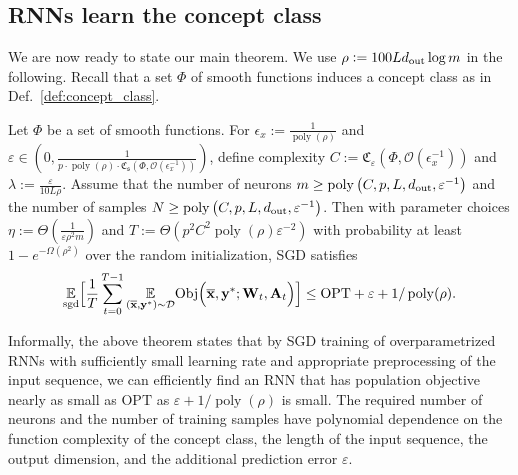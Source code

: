 \subsection{RNNs learn the concept class}
We are now ready to state our main theorem. We use $    \rho :=100 L d_{\mathrm{out}}  \log m$ in the following.  Recall that a set $\Phi$ of smooth functions induces a concept class as in Def.~\ref{def:concept_class}.
\begin{theorem}\label{thm:main_theorem_paper}
	Let $\Phi$ be a set of smooth functions.
	  For  $\epsilon_x := \frac{1}{\operatorname{poly}(\rho)}$ and $\varepsilon \in \left(0, \frac{1}{p \cdot \operatorname{poly}(\rho) \cdot \mathfrak{C}_{\mathfrak{s}}(\Phi, \mathcal{O}(\epsilon_x^{-1}))}\right)$, define complexity $C:=\mathfrak{C}_{\varepsilon}(\Phi, \mathcal{O}(\epsilon_x^{-1}))$
	and $\lambda:=\frac{\varepsilon}{10 L \rho}$. Assume that the number of neurons $m \geq \operatorname{poly}\left(C, p, L, d_{\mathrm{out}} , \varepsilon^{-1}\right)$ and the number of samples $N \geq \operatorname{poly}\left(C, p, L, d_{\mathrm{out}} , \varepsilon^{-1}\right)$. 
	Then with parameter choices $\eta:=\Theta\left(\frac{1}{\varepsilon \rho^{2} m}\right)$ and $T:=\Theta(p^{2} C^{2} \operatorname{poly}(\rho)\varepsilon^{-2})$
	with probability at least $1-e^{-\Omega\left(\rho^{2}\right)}$ over the random initialization, SGD satisfies
	\vspace{-2mm}
	\begin{align} \label{eqn:main-thm}
		\underset{\mathrm { sgd }}{\mathbb{E}}\Big[\frac{1}{T} \sum_{t=0}^{T-1} \underset{\left(\overline{\mathbf{x}}, \mathbf{y}^{\ast}\right) \sim \mathcal{D}}{\mathbb{E}} \mathrm{Obj}\Big(\overline{\mathbf{x}}, \mathbf{y}^{\ast};  \mathbf{W}_{t}, \mathbf{A}_t\Big)\Big] 
		\leq  \mathrm{OPT}+\varepsilon+ 1/\operatorname{poly}(\rho).
	\end{align}
\end{theorem}
\vspace{-2mm}
Informally, the above theorem states that by SGD training of overparametrized RNNs with sufficiently small learning rate and appropriate preprocessing of the input sequence, we can efficiently find an RNN that has population objective nearly as small as $\mathrm{OPT}$ as $\varepsilon+ 1/\operatorname{poly}(\rho)$ is small.
The required number of neurons and the number of training samples have polynomial dependence on the function complexity of the concept class, %
the length of the input sequence, the output dimension, and the additional prediction error $\varepsilon$.  




